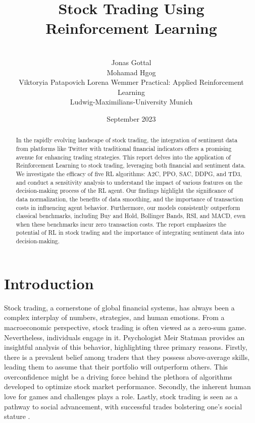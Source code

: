 \documentclass[12pt]{article}
\title{Stock Trading Using Reinforcement Learning}
\author{ \\ 
\AND
Jonas Gottal\\
\AND
Mohamad Hgog\\
\AND
Viktoryia Patapovich
\AND
Lorena Wemmer
\AND
\AND
\AND
	Practical: Applied Reinforcement Learning\\
\AND
	Ludwig-Maximilians-University Munich\\
}
\date{September 2023}
\begin{document}
\maketitle

\newpage
\tableofcontents
\thispagestyle{empty}

\newpage
\thispagestyle{empty}
\begin{abstract}
In the rapidly evolving landscape of stock trading, the integration of sentiment data from platforms like Twitter with traditional financial indicators offers a promising avenue for enhancing trading strategies. This report delves into the application of Reinforcement Learning to stock trading, leveraging both financial and sentiment data. We investigate the efficacy of five RL algorithms: A2C, PPO, SAC, DDPG, and TD3, and conduct a sensitivity analysis to understand the impact of various features on the decision-making process of the RL agent. Our findings highlight the
significance of data normalization, the benefits of data smoothing, and the importance of transaction costs in influencing agent behavior. Furthermore, our models consistently outperform classical benchmarks, including Buy and Hold, Bollinger Bands, RSI, and MACD, even when these benchmarks incur zero transaction costs. The report emphasizes the potential of RL in stock trading and the importance of integrating sentiment data into decision-making.
\end{abstract}





\newpage
\setcounter{page}{1}
\section{Introduction} %




Stock trading, a cornerstone of global financial systems, has always been a complex interplay of numbers, strategies, and human emotions. From a macroeconomic perspective, stock trading is often viewed as a zero-sum game. Nevertheless, individuals engage in it. Psychologist Meir Statman provides an insightful analysis of this behavior, highlighting three primary reasons. Firstly, there is a prevalent belief among traders that they possess above-average skills, leading them to assume that their portfolio will outperform others. This overconfidence might be a driving force behind the plethora of algorithms developed to optimize stock market performance. Secondly, the inherent human love for games and challenges plays a role. Lastly, stock trading is seen as a pathway to social advancement, with successful trades bolstering one's social stature \cite{statman2002lottery}. 
\end{document}
